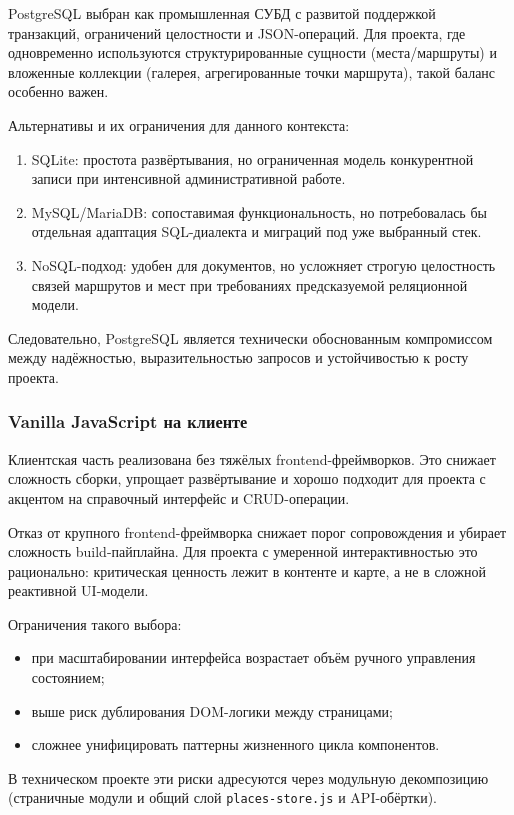 PostgreSQL выбран как промышленная СУБД с развитой поддержкой транзакций,
ограничений целостности и JSON-операций. Для проекта, где одновременно используются
структурированные сущности (места/маршруты) и вложенные коллекции (галерея,
агрегированные точки маршрута), такой баланс особенно важен.

Альтернативы и их ограничения для данного контекста:
\begin{enumerate}
	\item SQLite: простота развёртывания, но ограниченная модель конкурентной записи
	при интенсивной административной работе.
	\item MySQL/MariaDB: сопоставимая функциональность, но потребовалась бы отдельная
	адаптация SQL-диалекта и миграций под уже выбранный стек.
	\item NoSQL-подход: удобен для документов, но усложняет строгую целостность
	связей маршрутов и мест при требованиях предсказуемой реляционной модели.
\end{enumerate}

Следовательно, PostgreSQL является технически обоснованным компромиссом между
надёжностью, выразительностью запросов и устойчивостью к росту проекта.

\subsubsection{Vanilla JavaScript на клиенте}
Клиентская часть реализована без тяжёлых frontend-фреймворков.
Это снижает сложность сборки, упрощает развёртывание и хорошо подходит
для проекта с акцентом на справочный интерфейс и CRUD-операции.

Отказ от крупного frontend-фреймворка снижает порог сопровождения и убирает
сложность build-пайплайна. Для проекта с умеренной интерактивностью это
рационально: критическая ценность лежит в контенте и карте, а не в сложной
реактивной UI-модели.

Ограничения такого выбора:
\begin{itemize}
	\item при масштабировании интерфейса возрастает объём ручного управления состоянием;
	\item выше риск дублирования DOM-логики между страницами;
	\item сложнее унифицировать паттерны жизненного цикла компонентов.
\end{itemize}

В техническом проекте эти риски адресуются через модульную декомпозицию
(страничные модули и общий слой \texttt{places-store.js} и API-обёртки).

